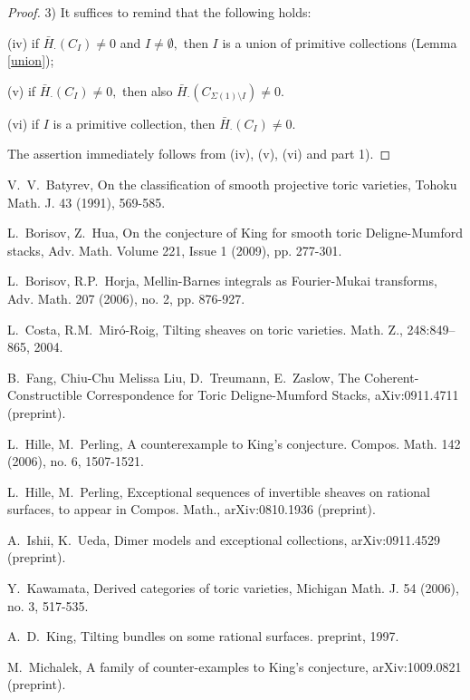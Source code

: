 \documentclass[11pt,leqno]{amsart}
\numberwithin{equation}{section}
\begin{document}
\begin{proof}
3) It suffices to remind that the following holds:

(iv) if $\bar{H}_{\cdot}(C_I)\ne 0$ and $I\ne\emptyset,$ then $I$ is a union of primitive collections (Lemma \ref{union});

(v) if $\bar{H}_{\cdot}(C_I)\ne 0,$ then also $\bar{H}_{\cdot}(C_{\Sigma(1)\setminus I})\ne 0.$

(vi) if $I$ is a primitive collection, then $\bar{H}_{\cdot}(C_I)\ne 0.$

The assertion immediately follows from (iv), (v), (vi) and part 1).
\end{proof}


\begin{thebibliography}{99999}

V.~V.~Batyrev, On the classification of smooth projective toric varieties, Tohoku Math. J. 43 (1991), 569-585.

L.~Borisov, Z.~Hua, On the conjecture of King for smooth toric Deligne-Mumford stacks, Adv. Math. Volume 221, Issue 1 (2009), pp. 277-301.

L.~Borisov, R.P.~Horja, Mellin-Barnes integrals as Fourier-Mukai transforms, Adv. Math. 207 (2006), no. 2, pp. 876-927.

L.~Costa, R.M.~Mir\'o-Roig, Tilting sheaves on toric varieties. Math. Z., 248:849--865, 2004.

B.~Fang, Chiu-Chu Melissa Liu, D.~Treumann, E.~Zaslow, The Coherent-Constructible Correspondence for Toric Deligne-Mumford Stacks,
aXiv:0911.4711 (preprint).

 L.~Hille, M.~Perling, A counterexample to King's conjecture. Compos. Math.
142 (2006), no. 6, 1507-1521.

 L.~Hille, M.~Perling, Exceptional sequences of invertible sheaves on rational surfaces, to appear in Compos. Math.,
arXiv:0810.1936 (preprint).

 A.~Ishii, K.~Ueda, Dimer models and exceptional collections, arXiv:0911.4529 (preprint).

 Y.~Kawamata, Derived categories of toric varieties, Michigan Math.
J. 54 (2006), no. 3, 517-535.

 A.~D.~King, Tilting bundles on some rational surfaces. preprint, 1997.

 M.~Michalek, A family of counter-examples to King's conjecture, arXiv:1009.0821 (preprint).


\end{thebibliography}
\end{document}
